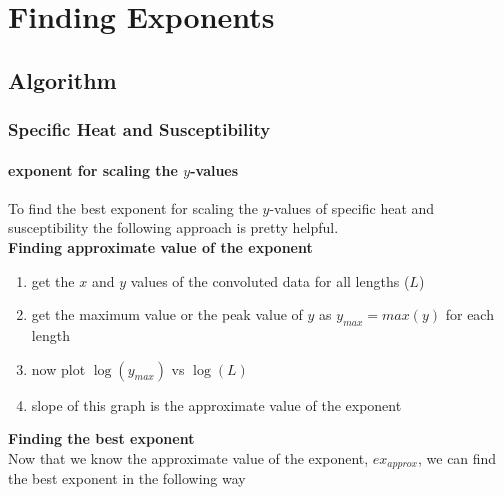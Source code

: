 \ifpdf
\graphicspath{{Appendix3/figs/}}
\else
\graphicspath{{Appendix3/figs/}}
\fi

\chapter{Finding Exponents}
\section{Algorithm}
	\subsection{Specific Heat and Susceptibility}
		\subsubsection{exponent for scaling the $y$-values}
		To find the best exponent for scaling the $y$-values of specific heat and susceptibility the following approach is pretty helpful.\\
		\textbf{Finding approximate value of the exponent}
		\begin{enumerate}
			\item get the $x$ and $y$ values of the convoluted data for all lengths ($L$)
			\item get the maximum value or the peak value of $y$ as $y_{max}=max(y)$ for each length
			\item now plot $\log(y_{max})$ vs $\log(L)$
			\item slope of this graph is the approximate value of the exponent
		\end{enumerate}
		\textbf{Finding the best exponent}\\
		Now that we know the approximate value of the exponent, $ex_{approx}$, we can find the best exponent in the following way
